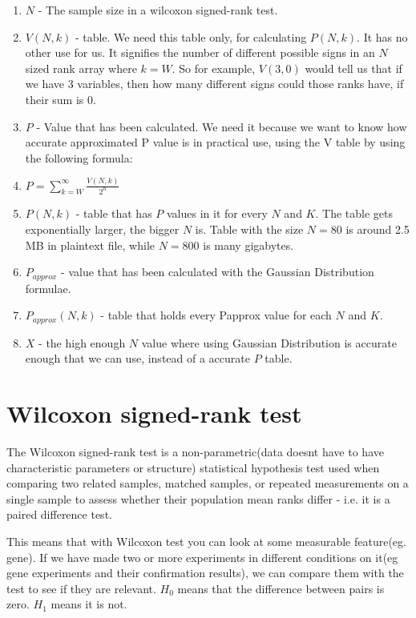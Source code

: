 \documentclass[12pt]{article}
\begin{document}
\begin{enumerate}
\item
$N$ - The sample size in a wilcoxon signed-rank test.
\item
$V(N, k)$ - table. We need this table only, for calculating $P(N, k)$. It has no other use for us. It signifies the number of different possible signs in an $N$ sized rank array where $k = W$.  So for example, $V(3, 0)$ would tell us that if we have 3 variables, then how many different signs could those ranks have, if their sum is 0.
\item
$P$ - Value that has been calculated. We need it because we want to know how accurate approximated P value is in practical use, using the V table by using the following formula:
\item
$P = \sum\limits_{k=W}^{\infty} \frac{V(N, k)}{2^n}$
\item
$P(N, k)$ - table that has $P$ values in it for every $N$ and $K$. The table gets exponentially larger, the bigger $N$ is. Table with the size $N=80$ is around 2.5 MB in plaintext file, while $N=800$ is many gigabytes.
\item
$P_{approx}$ - value that has been calculated with the Gaussian Distribution formulae.
\item
$P_{approx}(N, k)$ - table that holds every Papprox value for each $N$ and $K$.
\item
$X$ - the high enough $N$ value where using Gaussian Distribution is accurate enough that we can use, instead of a accurate $P$ table.
\end{enumerate}

\newpage

\section{Wilcoxon signed-rank test}

The Wilcoxon signed-rank test is a non-parametric(data doesnt have to have characteristic parameters or structure) statistical hypothesis test used when comparing two related samples, matched samples, or repeated measurements on a single sample to assess whether their population mean ranks differ - i.e. it is a paired difference test.

This means that with Wilcoxon test you can look at some measurable feature(eg. gene). If we have made two or more experiments in different conditions on it(eg gene experiments and their confirmation results), we can compare them with the test to see if they are relevant. $H_0$ means that the difference between pairs is zero. $H_1$ means it is not.
\end{document}
